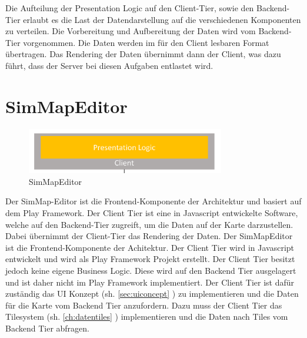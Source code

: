 \noindent
Die Aufteilung der Presentation Logic auf den Client-Tier, sowie den Backend-Tier erlaubt es die Last der Datendarstellung auf die verschiedenen Komponenten zu verteilen. Die Vorbereitung und Aufbereitung der Daten wird vom Backend-Tier vorgenommen. Die Daten werden im für den Client lesbaren Format übertragen. Das Rendering der Daten übernimmt dann der Client, was dazu führt, dass der Server bei diesen Aufgaben entlastet wird.
\newpage
\section{SimMapEditor}
\begin{figure}[H]
\centering
\includegraphics[height=2cm]{images/presentationlayer.png}
\caption{SimMapEditor}
\label{fig:presentationlayer}
\end{figure}
\noindent
Der SimMap-Editor ist die Frontend-Komponente der Architektur und basiert auf dem Play Framework. Der Client Tier ist eine in Javascript entwickelte Software, welche auf den Backend-Tier zugreift, um die Daten auf der Karte darzustellen. Dabei übernimmt der Client-Tier das Rendering der Daten.
Der SimMapEditor ist die Frontend-Komponente der Achitektur. Der Client Tier wird in Javascript entwickelt und wird als Play Framework Projekt erstellt. Der Client Tier besitzt jedoch keine eigene Business Logic. Diese wird auf den Backend Tier ausgelagert und ist daher nicht im Play Framework implementiert. Der Client Tier ist dafür zuständig das UI Konzept (sh. \ref{sec:uiconcept} ) zu implementieren und die Daten für die Karte vom Backend Tier anzufordern. Dazu muss der Client Tier das Tilesystem (sh. \ref{ch:datentiles}  ) implementieren und die Daten nach Tiles vom Backend Tier abfragen.
